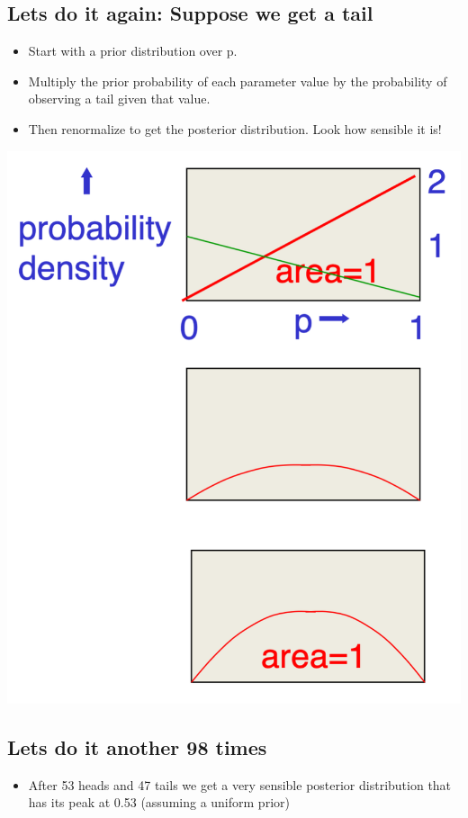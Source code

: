 \documentclass[11pt]{article}
\theoremstyle{definition}
\begin{document}
\subsection{Lets do it again: Suppose we get a tail}
\begin{itemize}
    \item Start with a prior distribution
    over p.
    \item Multiply the prior probability
    of each parameter value by
    the probability of observing
    a tail given that value.
    \item Then renormalize to get the
    posterior distribution. Look
    how sensible it is!
\end{itemize}

\includegraphics[width=\textwidth]{7.png}

\subsection{Lets do it another 98 times}

\begin{itemize}
    \item After 53 heads and 47
    tails we get a very
    sensible posterior
    distribution that has its
    peak at 0.53 (assuming a
    uniform prior)
\end{itemize}
\end{document}
